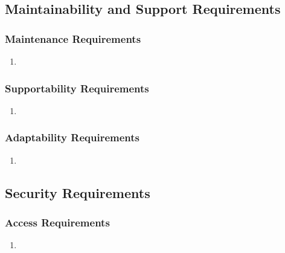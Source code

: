 \documentclass[english]{article}
\begin{document}

\subsection{Maintainability and Support Requirements}
\label{sub:maintainability_and_support_requirements}

\subsubsection{Maintenance Requirements}
\label{ssub:maintenance_requirements}
\begin{enumerate}[{MS}1. ]
	\item 
\end{enumerate}

\subsubsection{Supportability Requirements}
\label{ssub:supportability_requirements}
\begin{enumerate}[{MS}1. ]
	\item 
\end{enumerate}

\subsubsection{Adaptability Requirements}
\label{ssub:adaptability_requirements}
\begin{enumerate}[{MS}1. ]
	\item 
\end{enumerate}


\subsection{Security Requirements}
\label{sub:security_requirements}

\subsubsection{Access Requirements}
\label{ssub:access_requirements}
\begin{enumerate}[{SR}1. ]
	\item 
\end{enumerate}
\end{document}
